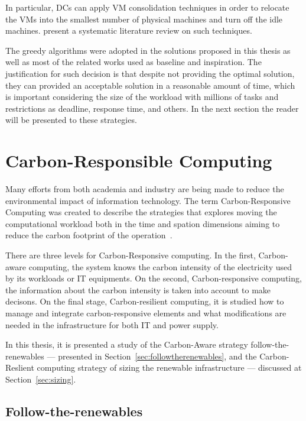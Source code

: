 

In particular, DCs can apply VM consolidation techniques in order to relocate the VMs into the smallest number of physical machines and turn off the idle
machines. \cite{10.1145/3470972} present a systematic literature review on such techniques.


The greedy algorithms were adopted in the solutions proposed in this thesis as well as most of the related works used as baseline and inspiration. The justification for such decision is that despite not providing the optimal solution, they can provided an acceptable solution in a reasonable amount of time, which is important considering the size of the workload with millions of tasks and restrictions as deadline, response time, and others. In the next section the reader will be presented to these strategies.


\section{Carbon-Responsible Computing}

\label{sec:carbon_responsive}

Many efforts from both academia and industry are being made to reduce the environmental impact of information technology. The term Carbon-Responsive Computing was created to describe the strategies that explores moving the computational workload both in the time and spation dimensions aiming to reduce the carbon footprint of the operation~\cite{schooler2021carbonaware}.

There are three levels for Carbon-Responsive computing. In the first, Carbon-aware computing, the system knows the carbon intensity of the electricity used by its workloads or IT equipments. On the second, Carbon-responsive computing, the information about the carbon intensity is taken into account to make decisons. On the final stage, Carbon-resilient computing, it is studied how to manage and integrate carbon-responsive elements and what modifications are needed in the infrastructure for both IT and power supply.

In this thesis, it is presented a study of the Carbon-Aware strategy follow-the-renewables --- presented in Section~\ref{sec:followtherenewables}, and the Carbon-Reslient computing strategy of sizing the renewable infrastructure --- discussed at Section~\ref{sec:sizing}.

\subsection{Follow-the-renewables}

